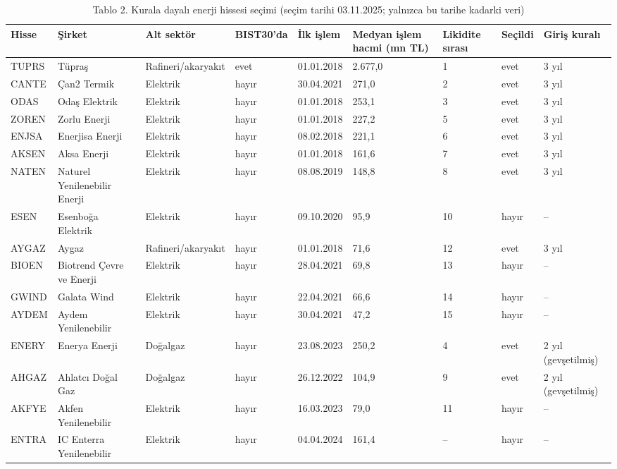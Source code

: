\begin{table}
\caption{Tablo 2. Kurala dayalı enerji hissesi seçimi (seçim tarihi 03.11.2025; yalnızca bu tarihe kadarki veri)}
\label{tab:tablo_02_enerji_secimi}
\begin{tabular}{lllllllll}
\toprule
Hisse & Şirket & Alt sektör & BIST30'da & İlk işlem & Medyan işlem hacmi (mn TL) & Likidite sırası & Seçildi & Giriş kuralı \\
\midrule
TUPRS & Tüpraş & Rafineri/akaryakıt & evet & 01.01.2018 & 2.677,0 & 1 & evet & 3 yıl \\
CANTE & Çan2 Termik & Elektrik & hayır & 30.04.2021 & 271,0 & 2 & evet & 3 yıl \\
ODAS & Odaş Elektrik & Elektrik & hayır & 01.01.2018 & 253,1 & 3 & evet & 3 yıl \\
ZOREN & Zorlu Enerji & Elektrik & hayır & 01.01.2018 & 227,2 & 5 & evet & 3 yıl \\
ENJSA & Enerjisa Enerji & Elektrik & hayır & 08.02.2018 & 221,1 & 6 & evet & 3 yıl \\
AKSEN & Aksa Enerji & Elektrik & hayır & 01.01.2018 & 161,6 & 7 & evet & 3 yıl \\
NATEN & Naturel Yenilenebilir Enerji & Elektrik & hayır & 08.08.2019 & 148,8 & 8 & evet & 3 yıl \\
ESEN & Esenboğa Elektrik & Elektrik & hayır & 09.10.2020 & 95,9 & 10 & hayır & – \\
AYGAZ & Aygaz & Rafineri/akaryakıt & hayır & 01.01.2018 & 71,6 & 12 & evet & 3 yıl \\
BIOEN & Biotrend Çevre ve Enerji & Elektrik & hayır & 28.04.2021 & 69,8 & 13 & hayır & – \\
GWIND & Galata Wind & Elektrik & hayır & 22.04.2021 & 66,6 & 14 & hayır & – \\
AYDEM & Aydem Yenilenebilir & Elektrik & hayır & 30.04.2021 & 47,2 & 15 & hayır & – \\
ENERY & Enerya Enerji & Doğalgaz & hayır & 23.08.2023 & 250,2 & 4 & evet & 2 yıl (gevşetilmiş) \\
AHGAZ & Ahlatcı Doğal Gaz & Doğalgaz & hayır & 26.12.2022 & 104,9 & 9 & evet & 2 yıl (gevşetilmiş) \\
AKFYE & Akfen Yenilenebilir & Elektrik & hayır & 16.03.2023 & 79,0 & 11 & hayır & – \\
ENTRA & IC Enterra Yenilenebilir & Elektrik & hayır & 04.04.2024 & 161,4 & – & hayır & – \\
\bottomrule
\end{tabular}
\end{table}
